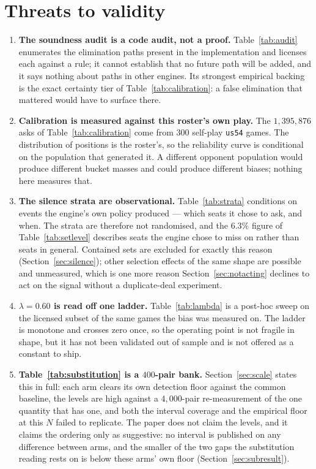 \documentclass[11pt]{article}
\newcommand{\code}[1]{\texttt{#1}}
\newcommand{\usff}{\code{us54}}
\begin{document}
\section{Threats to validity}
\label{sec:threats}

\begin{enumerate}
\item \textbf{The soundness audit is a code audit, not a proof.} Table~\ref{tab:audit}
  enumerates the elimination paths present in the implementation and licenses each against
  a rule; it cannot establish that no future path will be added, and it says nothing about
  paths in other engines. Its strongest empirical backing is the exact certainty tier of
  Table~\ref{tab:calibration}: a false elimination that mattered would have to surface
  there.

\item \textbf{Calibration is measured against this roster's own play.} The
  $1{,}395{,}876$ asks of Table~\ref{tab:calibration} come from $300$ self-play \usff{}
  games. The distribution of positions is the roster's, so the reliability curve is
  conditional on the population that generated it. A different opponent population would
  produce different bucket masses and could produce different biases; nothing here
  measures that.

\item \textbf{The silence strata are observational.} Table~\ref{tab:strata} conditions on
  events the engine's own policy produced --- which seats it chose to ask, and when. The
  strata are therefore not randomised, and the $6.3\%$ figure of
  Table~\ref{tab:setlevel} describes seats the engine chose to miss on rather than seats
  in general. Contained sets are excluded for exactly this reason
  (Section~\ref{sec:silence}); other selection effects of the same shape are possible and
  unmeasured, which is one more reason Section~\ref{sec:notacting} declines to act on the
  signal without a duplicate-deal experiment.

\item \textbf{$\lambda = 0.60$ is read off one ladder.} Table~\ref{tab:lambda} is a
  post-hoc sweep on the licensed subset of the same games the bias was measured on. The
  ladder is monotone and crosses zero once, so the operating point is not fragile in
  shape, but it has not been validated out of sample and is not offered as a constant to
  ship.

\item \textbf{Table~\ref{tab:substitution} is a $400$-pair bank.}
  Section~\ref{sec:scale} states this in full: each arm clears its own detection floor
  against the common baseline, the levels are high against a $4{,}000$-pair
  re-measurement of the one quantity that has one, and both the interval coverage and the
  empirical floor at this $N$ failed to replicate. The paper does not claim the levels,
  and it claims the ordering only as suggestive: no interval is published on any
  difference between arms, and the smaller of the two gaps the substitution reading rests
  on is below these arms' own floor (Section~\ref{sec:subresult}).


\end{enumerate}
\end{document}
